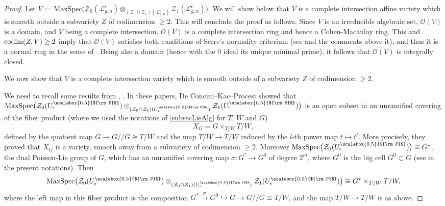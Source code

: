 \documentclass[11pt]{amsart}
\newcommand{\e}{\epsilon}
\newcommand{\Oo}{\mathcal{O}}
\newcommand{\Pup}{{\scalebox{0.5}{${\rm P}$}}}
\begin{document}
\begin{proof} Let $V:=\mathrm{MaxSpec}\bigl(\mathcal{Z}_0(\mathcal{L}_{g,n}^{\e}) \otimes_{(\mathcal{Z}_0 \cap \mathcal{Z}_1)(\mathcal{L}_{g,n}^{\e})} \mathcal{Z}_1(\mathcal{L}_{g,n}^{\e})\bigr)$. We will show below that $V$ is a complete intersection affine variety which is smooth outside a subvariety $Z$ of codimension $\geq 2$. This will conclude the proof as follows. Since $V$ is an irreducible algebraic set, $\Oo(V)$ is a domain, and $V$ being a complete intersection, $\Oo(V)$ is a complete intersection ring and hence a Cohen-Macaulay ring. This and ${\rm codim}(Z, V)\geq 2$ imply that $\Oo(V)$ satisfies both conditions of Serre's normality criterium (see \cite[Th.\,23.8]{Matsumura} and the comments above it), and thus it is a normal ring in the sense of \cite[Rk. on p.\,64]{Matsumura}.  Being also a domain (hence with the $0$ ideal its unique minimal prime), it follows that $\Oo(V)$ is integrally closed. 

We now show that $V$ is a complete intersection variety which is smooth outside of a subvariety $Z$ of codimension $\geq 2$.

We need to recall some results from \cite[$\S$21.2-21.3]{DCP}, \cite[$\S$6]{DC-K-P1}. In these papers, De Concini--Kac--Procesi showed that $\mathrm{MaxSpec}\bigl( \mathcal{Z}_0(U_\e^\Pup)\otimes_{(\mathcal{Z}_0 \cap \mathcal{Z}_1)(U_\e^\Pup)}\mathcal{Z}_1(U_{\e}^\Pup) \bigr)$ is an open subset in an unramified covering of the fiber product (where we used the notations of \textsection 
\ref{subsecLieAlg} for $T$, $W$ and $G$)
\begin{equation}\label{defXG}
X_G = G \times_{T/W} T/W, 
\end{equation}
defined by the quotient map $G\to G/\!/G \cong T/W$ and the map $T/W \to T/W$ induced by the $l$-th power map $t\mapsto t^l$. More precisely, they proved that $X_G$ is a variety, smooth away from a subvariety of codimension $\geq 2$. Moreover $\mathrm{MaxSpec}\bigl( \mathcal{Z}_0(U_\e^\Pup)\bigr)\cong G^*$, the dual Poisson-Lie group of $G$, which has an unramified covering map $\sigma\colon G^*\to G^0$ of degree $2^m$, where $G^0$ is the big cell $G^0\subset G$ (see \cite[Th.\,2.27]{BR2} in the present notations). Then
\begin{equation}\label{MaxspecXG}
\mathrm{MaxSpec}\bigl( \mathcal{Z}_0(U_\e^\Pup)\otimes_{(\mathcal{Z}_0 \cap \mathcal{Z}_1)(U_\e^\Pup)} \mathcal{Z}_1(U_{\e}^\Pup) \bigr) \cong G^* \times_{T/W} T/W,
\end{equation}
where the left map in this fiber product is the composition $G^* \stackrel{\sigma}{\to} G^0 \hookrightarrow G\to G/\!/G \cong T/W$, and the map $T/W \to T/W$ is as above.  


\end{proof}
\end{document}

